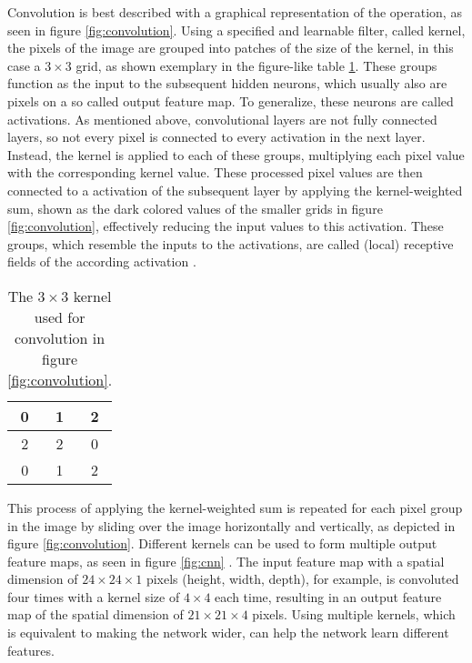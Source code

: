 Convolution is best described with a graphical representation of the operation, as seen in figure \ref{fig:convolution}. Using a specified and learnable filter, called kernel, the pixels of the image are grouped into patches of the size of the kernel, in this case a \( 3 \times 3 \) grid, as shown exemplary in the figure-like table \ref{tab:kernel}. These groups function as the input to the subsequent hidden neurons, which usually also are pixels on a so called output feature map. To generalize, these neurons are called activations. As mentioned above, convolutional layers are not fully connected layers, so not every pixel is connected to every activation in the next layer. Instead, the kernel is applied to each of these groups, multiplying each pixel value with the corresponding kernel value. These processed pixel values are then connected to a activation of the subsequent layer by applying the kernel-weighted sum, shown as the dark colored values of the smaller grids in figure \ref{fig:convolution}, effectively reducing the input values to this activation. These groups, which resemble the inputs to the activations, are called (local) receptive fields of the according activation \autocite{Alzubaidi.Zhang.ea2021,Dumoulin.Visin2018,Szeliski2022}.

\begin{table}[htb]
    \centering
    \caption[\( 3 \times 3 \) Kernel]{The \( 3 \times 3 \) kernel used for convolution in figure \ref{fig:convolution}.}
    \begin{tabular}{|c|c|c|}
        \toprule
        0 & 1 & 2 \\
        \midrule
        2 & 2 & 0 \\
        \midrule
        0 & 1 & 2 \\
        \bottomrule
    \end{tabular}
    \label{tab:kernel}
\end{table}

This process of applying the kernel-weighted sum is repeated for each pixel group in the image by sliding over the image horizontally and vertically, as depicted in figure \ref{fig:convolution}. Different kernels can be used to form multiple output feature maps, as seen in figure \ref{fig:cnn} \autocite{Alzubaidi.Zhang.ea2021,Dumoulin.Visin2018,Szeliski2022}. The input feature map with a spatial dimension of \( 24 \times 24 \times 1 \) pixels (height, width, depth), for example, is convoluted four times with a kernel size of \( 4 \times 4 \) each time, resulting in an output feature map of the spatial dimension of \( 21 \times 21 \times 4 \) pixels. Using multiple kernels, which is equivalent to making the network wider, can help the network learn different features.

